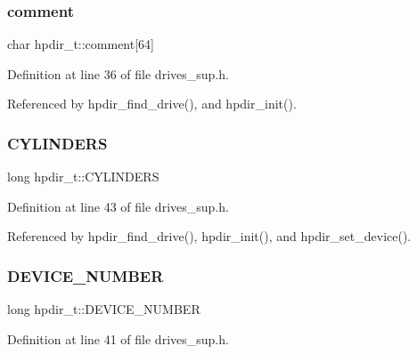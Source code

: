 \mbox{\label{structhpdir__t_aa2ba4f9a627c74e84a515e8ac4893bfb}} 
\subsubsection{\texorpdfstring{comment}{comment}}
{\footnotesize\ttfamily char hpdir\+\_\+t\+::comment\mbox{[}64\mbox{]}}



Definition at line 36 of file drives\+\_\+sup.\+h.



Referenced by hpdir\+\_\+find\+\_\+drive(), and hpdir\+\_\+init().

\mbox{\label{structhpdir__t_ac153c658b4e5333b529826d125d40e1e}} 
\subsubsection{\texorpdfstring{C\+Y\+L\+I\+N\+D\+E\+RS}{CYLINDERS}}
{\footnotesize\ttfamily long hpdir\+\_\+t\+::\+C\+Y\+L\+I\+N\+D\+E\+RS}



Definition at line 43 of file drives\+\_\+sup.\+h.



Referenced by hpdir\+\_\+find\+\_\+drive(), hpdir\+\_\+init(), and hpdir\+\_\+set\+\_\+device().

\mbox{\label{structhpdir__t_a3e761e4a98a5fdbd789ebf89c50b805f}} 
\subsubsection{\texorpdfstring{D\+E\+V\+I\+C\+E\+\_\+\+N\+U\+M\+B\+ER}{DEVICE\_NUMBER}}
{\footnotesize\ttfamily long hpdir\+\_\+t\+::\+D\+E\+V\+I\+C\+E\+\_\+\+N\+U\+M\+B\+ER}



Definition at line 41 of file drives\+\_\+sup.\+h.



